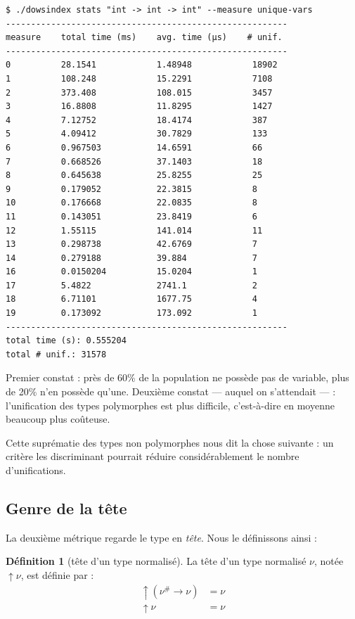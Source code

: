 \documentclass[a4paper]{report}
\theoremstyle{definition}
\newtheorem{definition}[theoreme]{Définition}
\begin{document}
\begin{verbatim}
$ ./dowsindex stats "int -> int -> int" --measure unique-vars
--------------------------------------------------------
measure    total time (ms)    avg. time (µs)    # unif.
--------------------------------------------------------
0          28.1541            1.48948            18902
1          108.248            15.2291            7108
2          373.408            108.015            3457
3          16.8808            11.8295            1427
4          7.12752            18.4174            387
5          4.09412            30.7829            133
6          0.967503           14.6591            66
7          0.668526           37.1403            18
8          0.645638           25.8255            25
9          0.179052           22.3815            8
10         0.176668           22.0835            8
11         0.143051           23.8419            6
12         1.55115            141.014            11
13         0.298738           42.6769            7
14         0.279188           39.884             7
16         0.0150204          15.0204            1
17         5.4822             2741.1             2
18         6.71101            1677.75            4
19         0.173092           173.092            1
--------------------------------------------------------
total time (s): 0.555204
total # unif.: 31578
\end{verbatim}

Premier constat : près de 60\% de la population ne possède pas de variable, plus de 20\% n'en possède qu'une. Deuxième constat — auquel on s'attendait — : l'unification des types polymorphes est plus difficile, c'est-à-dire en moyenne beaucoup plus coûteuse.

Cette suprématie des types non polymorphes nous dit la chose suivante : un critère les discriminant pourrait réduire considérablement le nombre d'unifications.


\subsection{Genre de la tête}

La deuxième métrique regarde le type en \emph{tête}. Nous le définissons ainsi :

\begin{definition}[tête d'un type normalisé]
  La tête d'un type normalisé $\nu$, notée $\uparrow \nu$, est définie par :
  \begin{align*}
      \uparrow (\nu^\# \rightarrow \nu) &=
      \nu
    \\
      \uparrow \nu &=
      \nu
  \end{align*}
\end{definition}
\end{document}
